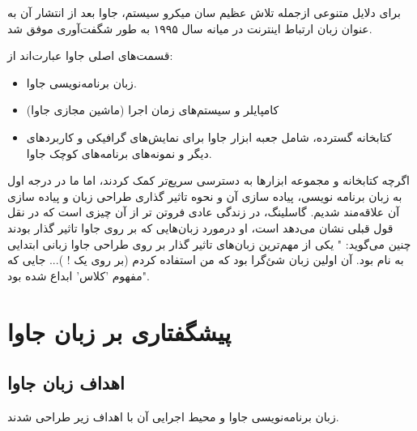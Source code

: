 \documentclass[a4paper,12pt]{report}
\begin{document}
	برای دلایل متنوعی ازجمله تلاش عظیم سان میکرو سیستم، ‌جاوا بعد از انتشار آن به عنوان زبان ارتباط اینترنت در میانه سال ۱۹۹۵ به طور شگفت‌آوری موفق شد.
	
	قسمت‌های اصلی جاوا عبارت‌اند از:
	
	\begin{itemize}[nosep]
		\renewcommand{\labelitemi}{\color{gray}\scriptsize$\blacksquare$}
		\item 
		زبان برنامه‌نویسی جاوا.
		\item
			کامپایلر و سیستم‌های زمان اجرا (ماشین مجازی جاوا)
		\item
		کتابخانه گسترده، شامل جعبه ابزار جاوا برای نمایش‌های گرافیکی و کاربرد‌های دیگر و نمونه‌های برنامه‌های کوچک جاوا.
	\end{itemize}

		اگرچه کتابخانه و مجموعه ابزارها به دسترسی سریع‌تر کمک کردند،‌ اما ما در درجه اول به زبان برنامه نویسی، پیاده سازی آن و نحوه تاثیر گذاری طراحی زبان و پیاده سازی آن علاقه‌مند شدیم.
	گاسلینگ،‌ در زندگی عادی فروتن تر از آن چیزی است که در نقل قول قبلی نشان می‌دهد است، او درمورد زبان‌هایی که بر روی جاوا تاثیر گذار بودند چنین می‌گوید: " یکی از مهم‌ترین زبان‌های تاثیر گذار بر روی طراحی جاوا زبانی ابتدایی به نام 
	\textit{}
	بود. آن اولین زبان شئ‌گرا بود که من استفاده کردم (بر روی یک 
	!
	)... جایی که مفهوم 'کلاس' ابداع شده بود".
	
	\section{پیشگفتاری بر زبان جاوا}\label{sec1:chap13}
	\subsection{اهداف زبان جاوا}\label{subsec1:sec1:chap13}
	
	زبان برنامه‌نویسی جاوا و محیط اجرایی آن با اهداف زیر طراحی شدند.
	
\end{document}

